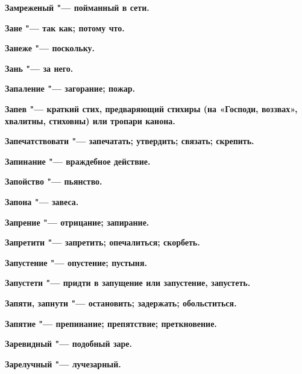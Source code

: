 \begin{multicols}{2}
\bfseries Замреженый\normalfont{} "--- пойманный в сети. 




\bfseries Зане\normalfont{} "--- так как; потому что. 




\bfseries Занеже\normalfont{} "--- поскольку. 




\bfseries Зань\normalfont{} "--- за него. 




\bfseries Запаление\normalfont{} "--- загорание; пожар. 




\bfseries Запев\normalfont{} "--- краткий стих, предваряющий стихиры (на «Господи, воззвах», хвалитны, стиховны) или тропари канона. 




\bfseries Запечатствовати\normalfont{} "--- запечатать; утвердить; связать; скрепить. 




\bfseries Запинание\normalfont{} "--- враждебное действие. 




\bfseries Запойство\normalfont{} "--- пьянство. 




\bfseries Запона\normalfont{} "--- завеса. 




\bfseries Запрение\normalfont{} "--- отрицание; запирание. 




\bfseries Запретити\normalfont{} "--- запретить; опечалиться; скорбеть. 




\bfseries Запустение\normalfont{} "--- опустение; пустыня. 




\bfseries Запустети\normalfont{} "--- придти в запущение или запустение, запустеть. 




\bfseries Запяти, запнути\normalfont{} "--- остановить; задержать; обольститься. 




\bfseries Запятие\normalfont{} "--- препинание; препятствие; преткновение. 




\bfseries Заревидный\normalfont{} "--- подобный заре. 




\bfseries Зарелучный\normalfont{} "--- лучезарный. 





\end{multicols}
